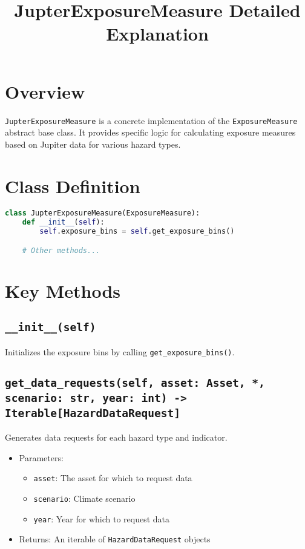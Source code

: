 \documentclass{article}
\title{JupterExposureMeasure Detailed Explanation}
\author{}
\date{}
\begin{document}
\maketitle

\section{Overview}

\texttt{JupterExposureMeasure} is a concrete implementation of the \texttt{ExposureMeasure} abstract base class. It provides specific logic for calculating exposure measures based on Jupiter data for various hazard types.

\section{Class Definition}

\begin{lstlisting}[language=Python]
class JupterExposureMeasure(ExposureMeasure):
    def __init__(self):
        self.exposure_bins = self.get_exposure_bins()

    # Other methods...
\end{lstlisting}

\section{Key Methods}

\subsection{\texttt{\_\_init\_\_(self)}}
Initializes the exposure bins by calling \texttt{get\_exposure\_bins()}.

\subsection{\texttt{get\_data\_requests(self, asset: Asset, *, scenario: str, year: int) -> Iterable[HazardDataRequest]}}
Generates data requests for each hazard type and indicator.

\begin{itemize}
    \item Parameters:
    \begin{itemize}
        \item \texttt{asset}: The asset for which to request data
        \item \texttt{scenario}: Climate scenario
        \item \texttt{year}: Year for which to request data
    \end{itemize}
    \item Returns: An iterable of \texttt{HazardDataRequest} objects
\end{itemize}
\end{document}
